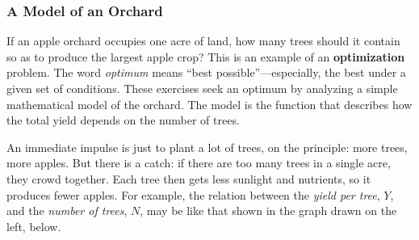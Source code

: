 \subsubsection{A Model of an Orchard}
\label{subsubsec:a-model-of-an-orchard}

If an apple orchard occupies one acre of land, how many trees should
it contain so as to produce the largest apple crop?  This is an
example of an {\bf optimization} problem.  The
word {\em optimum\/} means ``best
possible''---especially, the best under a given set of conditions.
These exercises seek an optimum by analyzing a simple mathematical
model of the orchard.  The model is the function that describes how
the total yield depends on the number of trees.

An immediate impulse is just to plant a lot of trees, on the
principle: more trees, more apples.  But there is a catch: if there
are too many trees in a single acre, they crowd together.  Each tree
then gets less sunlight and nutrients, so it produces fewer apples.
For example, the relation between the {\em yield per tree}, $Y$, and
the {\em number of trees}, $N$, may be like that shown in the graph
drawn on the left, below.

